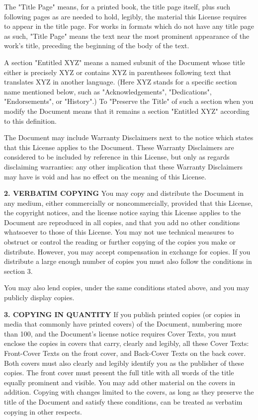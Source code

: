 The "Title Page" means, for a printed book, the title page itself, plus such following pages as are needed to hold, legibly, the material this License requires to appear in the title page. For works in formats which do not have any title page as such, "Title Page" means the text near the most prominent appearance of the work's title, preceding the beginning of the body of the text.

A section "Entitled XYZ" means a named subunit of the Document whose title either is precisely XYZ or contains XYZ in parentheses following text that translates XYZ in another language. (Here XYZ stands for a specific section name mentioned below, such as "Acknowledgements", "Dedications", "Endorsements", or "History".) To "Preserve the Title" of such a section when you modify the Document means that it remains a section "Entitled XYZ" according to this definition.

The Document may include Warranty Disclaimers next to the notice which states that this License applies to the Document. These Warranty Disclaimers are considered to be included by reference in this License, but only as regards disclaiming warranties: any other implication that these Warranty Disclaimers may have is void and has no effect on the meaning of this License. 


\textbf{2. VERBATIM COPYING}
You may copy and distribute the Document in any medium, either commercially or noncommercially, provided that this License, the copyright notices, and the license notice saying this License applies to the Document are reproduced in all copies, and that you add no other conditions whatsoever to those of this License. You may not use technical measures to obstruct or control the reading or further copying of the copies you make or distribute. However, you may accept compensation in exchange for copies. If you distribute a large enough number of copies you must also follow the conditions in section 3.

You may also lend copies, under the same conditions stated above, and you may publicly display copies.


\textbf{3. COPYING IN QUANTITY}
If you publish printed copies (or copies in media that commonly have printed covers) of the Document, numbering more than 100, and the Document's license notice requires Cover Texts, you must enclose the copies in covers that carry, clearly and legibly, all these Cover Texts: Front-Cover Texts on the front cover, and Back-Cover Texts on the back cover. Both covers must also clearly and legibly identify you as the publisher of these copies. The front cover must present the full title with all words of the title equally prominent and visible. You may add other material on the covers in addition. Copying with changes limited to the covers, as long as they preserve the title of the Document and satisfy these conditions, can be treated as verbatim copying in other respects.

